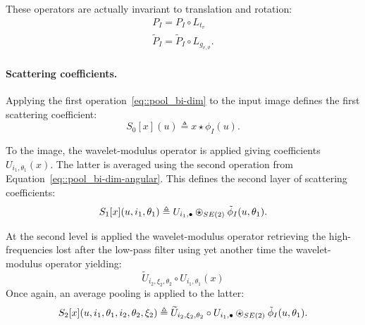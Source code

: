                 These operators are actually invariant to translation and rotation:
                \begin{align}
                    \label{eq::invariance_pooling}
                    P_I = P_I \circ L_{t_v}\\
                    \tilde{P}_I = \tilde{P}_I \circ L_{g_{v, \vartheta}}.
                \end{align}

            \paragraph{Scattering coefficients.}
                Applying the first operation~\ref{eq::pool_bi-dim} to the input image defines the first scattering coefficient:
                \begin{equation}
                    \label{eq::scatter_input}
                    S_0[x](u) \triangleq x \star \phi_I (u).
                \end{equation}
                
                To the image, the wavelet-modulus operator is applied giving coefficients $U_{i_1, \theta_1}(x)$.
                The latter is averaged using the second operation from Equation~\ref{eq::pool_bi-dim-angular}.
                This defines the second layer of scattering coefficients:
                \begin{equation}
                    \label{eq::scatter_first}
                    S_1[x](u, i_1, \theta_1) \triangleq U_{i_1, \bullet} \ostar_{SE(2)} \tilde{\phi}_I(u, \theta_1).
                \end{equation}

                At the second level is applied the wavelet-modulus operator retrieving the high-frequencies lost after the low-pass filter using yet another time the wavelet-modulus operator yielding:
                \begin{equation}
                    \label{eq::cascade_second}
                    \widetilde{U}_{i_2,\xi_2, \theta_2} \circ U_{i_1, \theta_1}(x)
                \end{equation}
                Once again, an average pooling is applied to the latter:
                \begin{equation}
                    \label{eq::scatter_second}
                    S_2[x](u, i_1, \theta_1, i_2, \theta_2, \xi_2) \triangleq \widetilde{U}_{i_2,\xi_2, \theta_2} \circ U_{i_1, \bullet} \ostar_{SE(2)} \tilde{\phi}_I(u, \theta_1).
                \end{equation}
                

